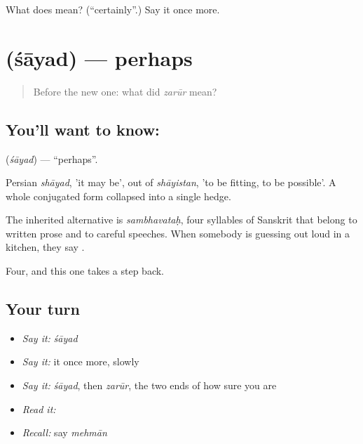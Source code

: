 \begin{tcolorbox}[breakable,colback=teal!4,colframe=teal!35!black,title={Before you move on}]
What does  mean? (\textquotedblleft{}certainly\textquotedblright{}.) Say it once more.
\end{tcolorbox}
\section[\texorpdfstring{\hi{शायद} (śāyad)}{शायद (śāyad)}]{ (śāyad) — perhaps}

\label{lesson:HI-C48-perhaps}



\begin{quote}
Before the new one: what did \emph{zarūr} mean?
\end{quote}

\subsection*{You'll want to know: }
\textbf{} (\emph{śāyad}) — \textquotedblleft{}perhaps\textquotedblright{}.

Persian \emph{shāyad}, 'it may be', out of \emph{shāyistan}, 'to be fitting, to be possible'. A whole conjugated form collapsed into a single hedge.

The inherited alternative is \emph{sambhavataḥ}, four syllables of Sanskrit that belong to written prose and to careful speeches. When somebody is guessing out loud in a kitchen, they say .

\begin{grammarlens}[title={What you've built}]
Four, and this one takes a step back.
\end{grammarlens}

\subsection*{Your turn}
\begin{itemize}
\raggedright
  \item \emph{Say it:} \emph{śāyad}
  \item \emph{Say it:} it once more, slowly
  \item \emph{Say it:} \emph{śāyad}, then \emph{zarūr}, the two ends of how sure you are
  \item \emph{Read it:} \textbf{}
  \item \emph{Recall:} say \emph{mehmān}
\end{itemize}

